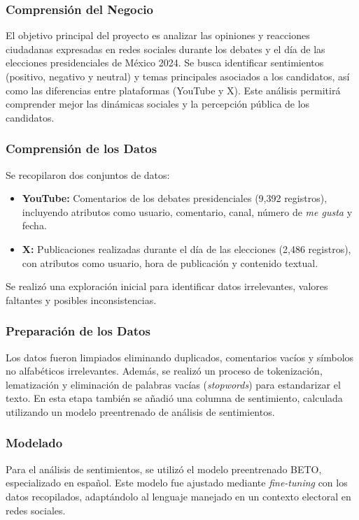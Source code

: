 \documentclass[10pt, a4paper]{article}
\begin{document}
	\subsubsection{Comprensión del Negocio}
	El objetivo principal del proyecto es analizar las opiniones y reacciones ciudadanas expresadas en redes sociales durante los debates y el día de las elecciones presidenciales de México 2024. Se busca identificar sentimientos (positivo, negativo y neutral) y temas principales asociados a los candidatos, así como las diferencias entre plataformas (YouTube y X). Este análisis permitirá comprender mejor las dinámicas sociales y la percepción pública de los candidatos.
	
	\subsubsection{Comprensión de los Datos}
	Se recopilaron dos conjuntos de datos:
	\begin{itemize}
		\item \textbf{YouTube:} Comentarios de los debates presidenciales (9,392 registros), incluyendo atributos como usuario, comentario, canal, número de \textit{me gusta} y fecha.
		\item \textbf{X:} Publicaciones realizadas durante el día de las elecciones (2,486 registros), con atributos como usuario, hora de publicación y contenido textual.
	\end{itemize}
	Se realizó una exploración inicial para identificar datos irrelevantes, valores faltantes y posibles inconsistencias.
	
	\subsubsection{Preparación de los Datos}
	Los datos fueron limpiados eliminando duplicados, comentarios vacíos y símbolos no alfabéticos irrelevantes. Además, se realizó un proceso de tokenización, lematización y eliminación de palabras vacías (\textit{stopwords}) para estandarizar el texto. En esta etapa también se añadió una columna de sentimiento, calculada utilizando un modelo preentrenado de análisis de sentimientos.
	
	\subsubsection{Modelado}
	Para el análisis de sentimientos, se utilizó el modelo preentrenado BETO, especializado en español. Este modelo fue ajustado mediante \textit{fine-tuning} con los datos recopilados, adaptándolo al lenguaje manejado en un contexto electoral en redes sociales. 
	
\end{document}
